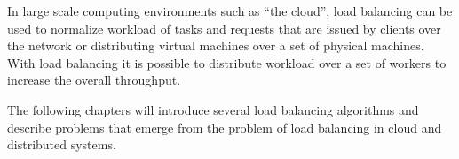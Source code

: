 In large scale computing environments such as ``the cloud'', load balancing can
be used to normalize workload of tasks and requests that are issued by
clients over the network \cite{alakeel2010guide} or distributing virtual machines
over a set of physical machines.
With load balancing it is possible to distribute workload over a set of workers
to increase the overall throughput.

The following chapters will introduce several load balancing algorithms and
describe problems that emerge from the problem of load balancing in cloud and
distributed systems.

